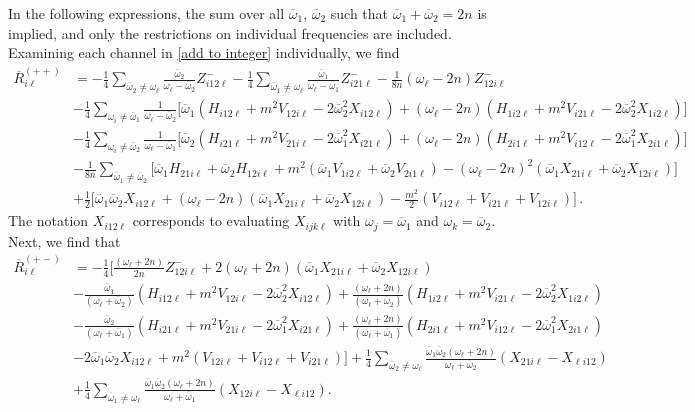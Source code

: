 \documentclass[letterpaper,11pt]{article}
\newcommand{\oi}{\omega_i}
\newcommand{\ol}{\omega_\ell}
\newcommand{\oone}{\overline{\omega}_1}
\newcommand{\otwo}{\overline{\omega}_2}
\begin{document}
In the following expressions, the sum over all $\oone$, $\otwo$ such that $\oone + \otwo = 2n$ is implied, and only the restrictions on individual frequencies are included. Examining each channel in \eqref{add to integer} individually, we find
\begin{align}
\label{R1}
\overline{R}^{(++)}_{i \ell} &= - \frac{1}{4} \sum_{\otwo \neq \ol} \frac{\otwo}{\ol - \otwo} Z^{-}_{i12\ell} - \frac{1}{4} \sum_{\oone \neq \ol} \frac{\oone}{\ol - \oone} Z^{-}_{i21\ell} - \frac{1}{8n} \left( \ol - 2n \right) Z^-_{12i\ell} \nonumber \\
%
& - \frac{1}{4} \sum_{\oi \neq \oone} \frac{1}{\ol - \otwo} \Big[ \oone \left( H_{i12\ell} + m^2 V_{12i\ell} - 2 \otwo^2 X_{i12\ell} \right) + (\ol - 2n) \left( H_{1i2\ell} + m^2 V_{i21\ell} - 2\otwo^2 X_{1i2\ell} \right)\Big] \nonumber \\
%
& - \frac{1}{4} \sum_{\oi \neq \otwo} \frac{1}{\ol - \oone} \Big[ \otwo \left( H_{i21\ell} + m^2 V_{21i\ell} - 2\oone^2 X_{i21\ell} \right) + (\ol - 2n) \left( H_{2i1\ell} + m^2 V_{i12\ell} - 2\oone^2 X_{2i1\ell} \right) \Big] \nonumber \\
%
& - \frac{1}{8n} \sum_{\oone \neq \otwo} \Big[ \oone H_{21i\ell} + \otwo H_{12i\ell} + m^2 \left( \oone V_{1i2\ell} + \otwo V_{2i1\ell} \right) - \left( \ol - 2n \right)^2 \left(\oone X_{21i\ell} + \otwo X_{12i\ell} \right) \Big] \nonumber \\
%
& + \frac{1}{2} \Big[ \oone\otwo X_{i12\ell} + \left( \ol - 2n \right)\left( \oone X_{21i\ell} + \otwo X_{12i\ell} \right) - \frac{m^2}{2} \left( V_{i12\ell} + V_{i21\ell} + V_{12i\ell} \right) \Big] \, .
\end{align}
The notation $X_{i12\ell}$ corresponds to evaluating $X_{ijk\ell}$ with $\omega_j = \oone$ and $\omega_k = \otwo$. Next, we find that
\begin{align}
\label{R2}
\overline{R}_{i \ell}^{(+-)} &= - \frac{1}{4} \Big[ \frac{(\ol + 2n)}{2n} Z^-_{12i\ell} + 2 (\ol + 2n) \left( \oone X_{21i\ell} + \otwo X_{12i\ell} \right) \nonumber \\
%
& -\frac{\oone}{(\ol + \otwo)} \left( H_{i12\ell} + m^2 V_{12i\ell} - 2 \otwo^2 X_{i12\ell} \right) + \frac{(\ol + 2n)}{(\ol + \otwo)} \left( H_{1i2\ell} + m^2 V_{i21\ell} - 2\otwo^2 X_{1i2\ell} \right)  \nonumber \\
%
&- \frac{\otwo}{(\ol + \oone)} \left( H_{i21\ell} + m^2 V_{21i\ell} - 2\oone^2 X_{i21\ell} \right) + \frac{(\ol + 2n)}{(\ol + \oone)} \left(H_{2i1\ell} + m^2 V_{i12\ell} - 2\oone^2 X_{2i1\ell} \right)  \nonumber \\
%
&  - 2 \oone\otwo X_{i12\ell} + m^2 \left( V_{12i\ell} + V_{i12\ell} + V_{i21\ell} \right) \Big] + \frac{1}{4} \sum_{\otwo \neq \ol} \frac{\oone\otwo(\ol + 2n)}{\ol + \otwo} \left( X_{21i\ell} - X_{\ell i 12} \right) \nonumber \\
%
& + \frac{1}{4} \sum_{\oone \neq \ol} \frac{\oone\otwo(\ol + 2n)}{\ol + \oone} \left( X_{12i\ell} - X_{\ell i 12} \right).
\end{align}
\end{document}
